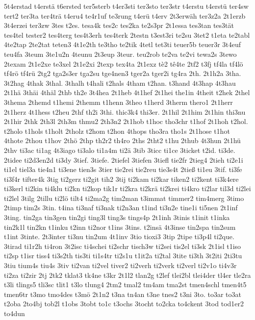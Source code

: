 {5t4erstad
t4erstä
t6ersted
ter5sterb
t4er3sti
ter3sto
ter3str
t4erstu
t4erstü
ter4sw
tert2
ter3ta
ter4trä
t4eru4
te4r1uf
te3rung
t4erü
t4erv
2t3erwäh
ter3z2a
2t1erzb
3t4erzei
ter3zw
3tes
t2es.
tesa4k
tes2c
tes2ka
te2s3pr
2t1essa
tes3tan
tes3tät
tes4tel
tester2
tes4terg
tes4t3erh
tes4terk
2testn
t3est3ri
te2su
3tet2
t1eta
te2tabl
4te2tap
2te2tat
teten3
4t1e2th
te3tho
te2tik
4tetl
tet3ti
teuer5b
teuer3r
3t4euf
teu4fa
3teum
3te1u2n
4teunu
2t3eup
3teur.
teu2rob
te2va
te2vi
tewa2s
3tewo
2texam
2t1e2xe
te3xel
2t1e2xi
2texp
tex4ta
2t1exz
tè2
tê4te
2tf2
t3fj
tf4la
tf4lö
tf4rö
tf4rü
2tg2
tga2s3er
tga2su
tge4nen3
tger2a
tger2i
tg4ra
2th.
2t1h2a
3tha.
3t2hag
4thak
3thal.
3thalh
t4hali
t2hals
4tham
t2han.
t3hand
4t3hap
4t3hau
2t1hä
3thäi
4thäl
2thb
th2e
3t4hea
2t1heb
4t1hef
2t1hei
the1in
4theit
t2hek
2thel
3thema
2themd
t1hemi
2themm
t1henn
3theo
t1herd
3therm
thero1
2t1herr
2t1herz
4t1hess
t2heu
2thf
th2i
3thi.
thic3k4
thi3er.
2t1hil
2t1him
2t1hin
thi3nu
2t1hir
2thk
2th3l
2th3m
thmu2
2th3n2
2t1hob
t1hoc
tho3chr
t1hof
2t1hoh
t2hol.
t2holo
t1hols
t1holt
2tholz
t2hom
t2hon
4thops
tho3ra
tho1s
2t1hose
t1hot
4thote
2thou
t1hov
2thö
2thp
th2r2
th4ro
2ths
2tht2
t1hu
2thub
4t3hun
2t1hü
2thv
ti3ac
ti1ag
4t3iago
ti3alo
ti1a4m
ti2ä
3tib
3ticc
ti1ce
3ticket
t2id.
ti3de.
2tidee
ti2d3en2d
ti3dy
3tief.
3tiefe.
2tiefel
3tiefen
3tiefl
tie2fr
2tieg4
2tieh
ti2e1i
ti1el
tiel3a
tie4n1
ti3ene
tien3s
3tier
tie2rei
tie2reu
tie3s4t
2tieß
ti1eu
3tif.
ti3fe
ti3f4r
tifter4k
3tig
ti2gerz
ti2git
tih2
3tij
ti2kam
ti2kar
tiken2
ti2kent
ti3k4ere
ti3kerl
ti2kin
ti4klu
ti2kn
ti2kop
tik1r
ti2kra
ti2krä
ti2krei
ti4kro
ti2lar
til3d
ti2lei
ti2lel
3tilg
2tillu
ti2lö
tilt4
ti2ma2g
tim2man
t3immat
timmer2
tim4merg
3timo
2timp
tim2s
3tin.
t4ina
ti3naf
ti3nak
ti2n3an
t1ind
ti3n2e
tine1i
ti5nen
2t1inf
3ting.
tin2ga
tin3gen
tin2gi
ting3l
ting3s
tings4p
2t1inh
3tinis
t1init
t1inka
tin2k1l
tin2kn
t1inku
t2inn
ti2nor
t1ins
3tins.
t2insä
4t3inse
tin2spa
tin2sum
t1int
3tinte.
2t3inter
ti3nu
tin2um
4t1inv
3tio
tioxi3
3tip
2tipe
ti3p4l
ti2que.
3tirad
ti1r2h
ti4ron
3t2isc
ti4schei
ti2schr
tisch3w
ti2sei
tis2el
ti3sk
2t1isl
t1iso
ti2sp
t1isr
tiss4
ti3s2th
tis3ti
ti1s4tr
ti2s1u
t1it2a
ti2tal
3tite
ti3th
3t2iti
2ti3tu
3tiu
tium4s
tiu4s
3tiv
ti2van
ti2vel
tiver2
ti2verh
ti2verk
ti2verl
ti2v1o
ti4v3r
ti2za
ti2zir
2tj
2tk2
tklat3
tk4ne
t3kr
2t1l2
tlan2g
t2lef
tlei2bl
tlei4der
tl4er
tle2ra
t3li
tlings5
tli3sc
tlit1
t3lo
tlung4
2tm2
tmal2
tm4am
tma2st
tmen4schl
tmen4t5
tmen6tr
t3mo
tmo4des
t3mö
2t1n2
t3na
tn4an
t3ne
tnes2
t3ni
3to.
to3ar
to3at
t2oba
2to4bj
tob2l
t1obs
3tobt
to1c
t3ochs
3tocht
to2cka
to4ckent
3tod
tod1er2
to4dun
}
